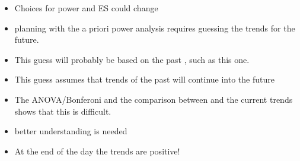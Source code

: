 \begin{itemize}
	\item Choices for power and ES could change
	\item planning with the a priori power analysis requires guessing the trends for the future.  %
	\item This guess will probably be based on the past , such as this one.
	\item This guess assumes that trends of the past will continue into the future
	\item The ANOVA/Bonferoni and the comparison between \citep{robinson2008ph} and the current trends shows that this is difficult.
	\item better understanding is needed
	\item At the end of the day the trends are positive!
\end{itemize}
	
